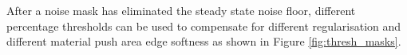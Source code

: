 After a noise mask has eliminated the steady state noise floor, different percentage thresholds can be used to compensate for different regularisation and different material push area edge softness as shown in Figure \ref{fig:thresh_masks}.
\begin{figure}[H]
\centering
    \begin{minipage}[t]{.3\textwidth}
        \vspace{0pt}
        \vfill

\end{minipage}
\end{figure}
